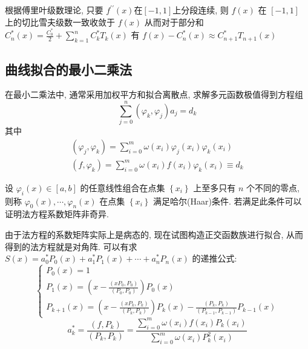 \documentclass[10pt]{yerbaformat}
\begin{document}
\par 根据傅里叶级数理论, 只要 $f^{\prime \prime}(x)$在$[-1,1]$上分段连续, 则 $f(x)$ 在 $[-1,1]$ 上的切比雪夫级数一致收敛于 $f(x)$ 从而对于部分和 $C_{n}^{*}(x)=\frac{C_{0}^{*}}{2}+\sum_{k=1}^{n} C_{k}^{*} T_{k}(x)$ 有 $f(x)-C_{n}^{*}(x) \approx C_{n+1}^{*} T_{n+1}(x)$

\subsection{曲线拟合的最小二乘法}
\par 在最小二乘法中, 通常采用加权平方和拟合离散点, 求解多元函数极值得到方程组
$$
    \sum_{j=0}^{n}\left(\varphi_{k}, \varphi_{j}\right) a_{j}=d_{k}
$$
其中
$$
    \begin{array}{l}
        \left(\varphi_{j}, \varphi_{k}\right)=\sum_{i=0}^{m} \omega\left(x_{i}\right) \varphi_{j}\left(x_{i}\right) \varphi_{k}\left(x_{i}\right) \\
        \left(f, \varphi_{k}\right)=\sum_{i=0}^{m} \omega\left(x_{i}\right) f\left(x_{i}\right) \varphi_{k}\left(x_{i}\right) \equiv d_{k}
    \end{array}
$$
\begin{definition}
    设 $\varphi_{i}(x) \in[a, b]$ 的任意线性组合在点集 $\left\{x_{i}\right\}$ 上至多只有 $n$ 个不同的零点, 则称 $\varphi_{0}(x), \cdots, \varphi_{n}(x)$ 在点集
    $\left\{x_{i}\right\}$ 满足哈尔(Haar)条件. 若满足此条件可以证明法方程系数矩阵非奇异.
\end{definition}

\par 由于法方程的系数矩阵实际上是病态的, 现在试图构造正交函数族进行拟合, 从而得到的法方程就是对角阵. 可以有求 $S(x)=a_{0}^{*} P_{0}(x)+a_{1}^{*} P_{1}(x)+\cdots+a_{n}^{*} P_{n}(x)$ 的递推公式:
$$
    \left\{\begin{array}{l}
        P_{0}(x)=1                                                                                     \\
        P_{1}(x)=\left(x-\frac{\left(x P_{0}, P_{0}\right)}{\left(P_{0}, P_{0}\right)}\right) P_{0}(x) \\
        P_{k+1}(x)=\left(x-\frac{\left(x P_{k}, P_{k}\right)}{\left(P_{k}, P_{k}\right)}\right) P_{k}(x)-\frac{\left(P_{k}, P_{k}\right)}{\left(P_{k-1}, P_{k-1}\right)} P_{k-1}(x)
    \end{array}\right.
$$
$$
    a_{k}^{*}=\frac{\left(f, P_{k}\right)}{\left(P_{k}, P_{k}\right)}=\frac{\sum_{i=0}^{m} \omega\left(x_{i}\right) f\left(x_{i}\right) P_{k}\left(x_{i}\right)}{\sum_{i=0}^{m} \omega\left(x_{i}\right) P_{k}^{2}\left(x_{i}\right)}
$$
\end{document}
